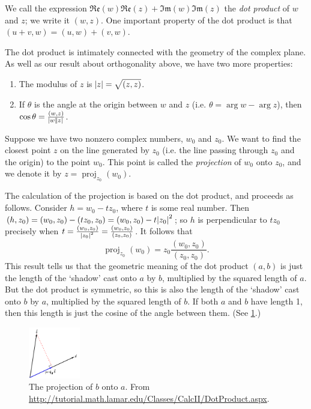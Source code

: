 \documentclass[a4paper,10pt,titlepage]{article}
\theoremstyle{definition}
\DeclareMathOperator{\proj}{proj}
\newcommand*\realp[1]{ \mathfrak{Re} \left ( {#1} \right )  }
\newcommand*\imagp[1]{ \mathfrak{Im} \left ( {#1} \right )  }
\begin{document}
We call the expression $ \realp w \realp z + \imagp w \imagp z $ the \emph{dot product} of $ w $ and $ z $; we write it $ (w, z) $. One
important property of the dot product is that $ (u + v, w) = (u, w) + (v, w) $.

The dot product is intimately connected with the geometry of the complex plane. As well as our result about orthogonality above,
we have two more properties:
\begin{enumerate}
  \item The modulus of $ z $ is $ \abs{z} = \sqrt{(z, z)} $.
  \item If $ \theta $ is the angle at the origin between $ w $ and $ z $ (i.e. $ \theta = \arg w - \arg z $), then $ \cos \theta = \frac{(w,z)}{\abs{w}\abs{z}} $.
\end{enumerate}

Suppose we have two nonzero complex numbers, $ w_0 $ and $ z_0 $. We want to find the closest point $ z $ on the line generated by $ z_0 $
(i.e. the line passing through $ z_0 $ and the origin) to the point $ w_0 $. This point is called the \emph{projection} of $ w_0 $ onto $ z_0 $,
and we denote it by $ z = \proj_{z_0}(w_0) $.

The calculation of the projection is based on the dot product, and proceeds as follows. Consider $ h = w_0 - tz_0 $, where $ t $ is some
real number. Then $ (h, z_0) = (w_0, z_0) - (tz_0, z_0) = (w_0, z_0) - t\abs{z_0}^2 $; so $ h $ is perpendicular to $ tz_0 $ precisely
when $ t = \frac{(w_0, z_0)}{\abs{z_0}^2} = \frac{(w_0, z_0)}{(z_0, z_0)} $. It follows that
\begin{displaymath}
  \proj_{z_0}(w_0) = z_0 \frac{(w_0, z_0)}{(z_0, z_0)}.
\end{displaymath}
This result tells us that the geometric meaning of the dot product $ (a,b) $ is just the length of the `shadow' cast onto $ a $
by $ b $, multiplied by the squared length of $ a $. But the dot product is symmetric, so this is also the length of the `shadow' cast onto $ b $
by $ a $, multiplied by the squared length of $ b $. If both $ a $ and $ b $ have length 1, then this length is just the cosine of
the angle between them. (See \cref{fig:projection}.)

\begin{figure}
  \centering
  \includegraphics[width=0.2\textwidth]{projection}
  \caption{The projection of $ b $ onto $ a $. From \url{http://tutorial.math.lamar.edu/Classes/CalcII/DotProduct.aspx}.\label{fig:projection}}
\end{figure}
\end{document}
